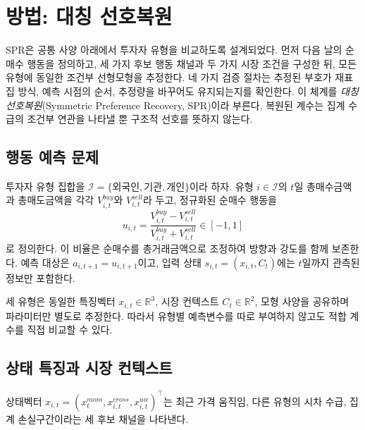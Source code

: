 
\section{방법: 대칭 선호복원}
\label{sec:method}

SPR은 공통 사양 아래에서 투자자 유형을 비교하도록 설계되었다. 먼저 다음 날의 순매수
행동을 정의하고, 세 가지 후보 행동 채널과 두 가지 시장 조건을 구성한 뒤, 모든 유형에
동일한 조건부 선형모형을 추정한다. 네 가지 검증 절차는 추정된 부호가 재표집 방식,
예측 시점의 순서, 추정량을 바꾸어도 유지되는지를 확인한다. 이 체계를
\emph{대칭 선호복원}(Symmetric Preference Recovery, SPR)이라 부른다. 복원된 계수는
집계 수급의 조건부 연관을 나타낼 뿐 구조적 선호를 뜻하지 않는다.

\subsection{행동 예측 문제}
\label{sec:setup}

투자자 유형 집합을
$\mathcal I=\{\text{외국인},\text{기관},\text{개인}\}$이라 하자. 유형 $i\in\mathcal I$의
$t$일 총매수금액과 총매도금액을 각각 $V^{buy}_{i,t}$와 $V^{sell}_{i,t}$라 두고,
정규화된 순매수 행동을
\begin{equation}
u_{i,t}=\frac{V^{buy}_{i,t}-V^{sell}_{i,t}}{V^{buy}_{i,t}+V^{sell}_{i,t}}\in[-1,1]
\label{eq:action}
\end{equation}
로 정의한다. 이 비율은 순매수를 총거래금액으로 조정하여 방향과 강도를 함께 보존한다.
예측 대상은 $a_{i,t+1}=u_{i,t+1}$이고, 입력 상태 $s_{i,t}=(x_{i,t},C_t)$에는 $t$일까지
관측된 정보만 포함한다.

세 유형은 동일한 특징벡터 $x_{i,t}\in\mathbb R^3$, 시장 컨텍스트
$C_t\in\mathbb R^2$, 모형 사양을 공유하며 파라미터만 별도로 추정한다. 따라서 유형별
예측변수를 따로 부여하지 않고도 적합 계수를 직접 비교할 수 있다.

\subsection{상태 특징과 시장 컨텍스트}
\label{sec:features}

상태벡터 $x_{i,t}=(x^{mom}_{t},x^{cross}_{i,t},x^{uw}_{i,t})^\top$는 최근 가격 움직임,
다른 유형의 시차 수급, 집계 손실구간이라는 세 후보 채널을 나타낸다.

